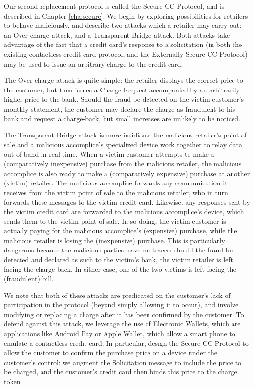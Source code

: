 
Our second replacement protocol is called the Secure CC Protocol, and is described in Chapter \ref{cha:secure}.
We begin by exploring possibilities for retailers to behave maliciously, and describe two attacks which a retailer may carry out:
    an Over-charge attack, and a Transparent Bridge attack.
Both attacks take advantage of the fact that a credit card's response to a solicitation
    (in both the existing contactless credit card protocol, and the Externally Secure CC Protocol)
    may be used to issue an arbitrary charge to the credit card.

The Over-charge attack is quite simple:
    the retailer displays the correct price to the customer, but then issues a Charge Request accompanied by an arbitrarily higher price to the bank.
Should the fraud be detected on the victim customer's monthly statement, the customer may declare the charge as fraudulent to his bank and request a charge-back,
    but small increases are unlikely to be noticed.

The Transparent Bridge attack is more insidious:
    the malicious retailer's point of sale and a malicious accomplice's specialized device work together to relay data out-of-band in real time.
When a victim customer attempts to make a (comparatively inexpensive) purchase from the malicious retailer,
    the malicious accomplice is also ready to make a (comparatively expensive) purchase at another (victim) retailer.
The malicious accomplice forwards any communication it receives from the victim point of sale to the malicious retailer,
    who in turn forwards these messages to the victim credit card.
Likewise, any responses sent by the victim credit card are forwarded to the malicious accomplice's device, which sends them to the victim point of sale.
In so doing, the victim customer is actually paying for the malicious accomplice's (expensive) purchase, while the malicious retailer is losing the (inexpensive) purchase.
This is particularly dangerous because the malicious parties leave no traces:
    should the fraud be detected and declared as such to the victim's bank, the victim retailer is left facing the charge-back.
In either case, one of the two victims is left facing the (fraudulent) bill.

We note that both of these attacks are predicated on the customer's lack of participation in the protocol (beyond simply allowing it to occur),
    and involve modifying or replacing a charge after it has been confirmed by the customer.
To defend against this attack, we leverage the use of Electronic Wallets, which are applications like Android Pay or Apple Wallet, which allow a smart phone to emulate a contactless credit card.
In particular, design the Secure CC Protocol to allow the customer to confirm the purchase price on a device under the customer's control:
    we augment the Solicitation message to include the price to be charged, and the customer's credit card then binds this price to the charge token.

